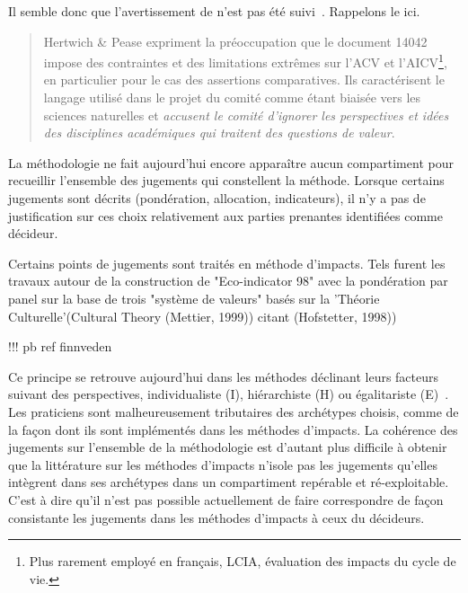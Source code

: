 Il semble donc que l'avertissement de \citeauthor{hertwich_theoretical_2000} n'est pas été suivi~\cite{hertwich_theoretical_2000}.
Rappelons le ici.
\blockcquote[traduction]{hertwich_theoretical_2000}{
Hertwich \& Pease expriment la préoccupation que le document 14042 impose des contraintes et des limitations extrêmes sur l'ACV et l'AICV\footnote{Plus rarement employé en français, LCIA, évaluation des impacts du cycle de vie.}, en particulier pour le cas des assertions comparatives. Ils caractérisent le langage utilisé dans le projet du comité comme étant biaisée vers les sciences naturelles et \emph{accusent le comité d'ignorer les perspectives et idées des disciplines académiques qui traitent des questions de valeur}.
}
La méthodologie ne fait aujourd'hui encore apparaître aucun compartiment pour recueillir l'ensemble des jugements qui constellent la méthode.
Lorsque certains jugements sont décrits (pondération, allocation, indicateurs), il n'y a pas de justification sur ces choix relativement aux parties prenantes identifiées comme décideur.

Certains points de jugements sont traités en méthode d'impacts.
Tels furent les travaux autour de la construction de "Eco-indicator 98" avec la pondération par panel sur la base de trois "système de valeurs" basés sur la 'Théorie Culturelle'(Cultural Theory (Mettier, 1999)) citant (Hofstetter, 1998))

!!! pb ref finnveden


Ce principe se retrouve aujourd'hui dans les méthodes déclinant leurs facteurs suivant des perspectives, individualiste (I), hiérarchiste (H) ou égalitariste (E)~\cite{goedkoop_recipe_2013}.
Les praticiens sont malheureusement tributaires des archétypes choisis, comme de la façon dont ils sont implémentés dans les méthodes d'impacts.
La cohérence des jugements sur l'ensemble de la méthodologie est d'autant plus difficile à obtenir que la littérature sur les méthodes d'impacts n'isole pas les jugements qu'elles intègrent dans ses archétypes dans un compartiment repérable et ré-exploitable.
C'est à dire qu'il n'est pas possible actuellement de faire correspondre de façon consistante les jugements dans les méthodes d'impacts à ceux du décideurs.


